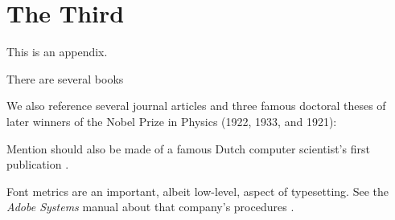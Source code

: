 
\chapter{The Third}

This is an appendix.

There are several books

We also reference several journal articles
\cite{%
    Babbage:1910:BBA,%
    Beebe:2007:ETM,%
    Beebe:1989:PCP,%
    Cody:1981:APF,%
    Einstein:1906:NBM,%
    Einstein:1911:BMAa,%
    Einstein:1911:BMAb,%
    Goldstine:1946:ENI,%
    Hall:1994:PNE,%
    Heilbron:1969:GBA,%
    Huskey:1980:LLC,%
    Johnson:1978:LDT,%
    Kim:1999:AFC,%
    Lahiri:2002:ADA,%
    Taylor:1995:RTP,%
    Wiles:1995:MEC%
}
and three famous doctoral theses of later winners
\cite{%
    Bohr:1911:SME,%
    Dirac:1926:QM,%
    Einstein:1905:NBM%
}
of the Nobel Prize in Physics (1922, 1933, and
1921):



Mention should also be made of a famous Dutch
computer scientist's first publication
\cite{Dijkstra:1953:FBV}.

Font metrics are an important, albeit low-level,
aspect of typesetting. See the \emph{Adobe
Systems} manual about that company's procedures
\cite{Adobe:1990:AFM}.


